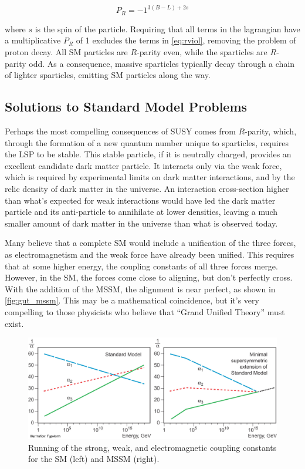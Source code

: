 \begin{equation}
P_R = -1^{3(B-L)+2s}
\end{equation}

where $s$ is the spin of the particle. Requiring that all terms in the lagrangian have a multiplicative $P_R$ of 1 excludes the terms in \autoref{eq:rviol}, removing the problem of proton decay. All \ac{SM} particles are $R$-parity even, while the sparticles are $R$-parity odd. As a consequence, massive sparticles typically decay through a chain of lighter sparticles, emitting \ac{SM} particles along the way.  

\subsection{Solutions to Standard Model Problems}

Perhaps the most compelling consequences of \ac{SUSY} comes from $R$-parity, which, through the formation of a new quantum number unique to sparticles, requires the \acf{LSP} to be stable. This stable particle, if it is neutrally charged, provides an excellent candidate dark matter particle. It interacts only via the weak force, which is required by experimental limits on dark matter interactions, and by the relic density of dark matter in the universe. An interaction cross-section higher than what's expected for weak interactions would have led the dark matter particle and its anti-particle to annihilate at lower densities, leaving a much smaller amount of dark matter in the universe than what is observed today.

Many believe that a complete \ac{SM} would include a unification of the three forces, as electromagnetism and the weak force have already been unified. This requires that at some higher energy, the coupling constants of all three forces merge. However, in the \ac{SM}, the forces come close to aligning, but don't perfectly cross. With the addition of the \ac{MSSM}, the alignment is near perfect, as shown in \autoref{fig:gut_mssm}. This may be a mathematical coincidence, but it's very compelling to those physicists who believe that ``Grand Unified Theory'' must exist. 

\begin{centering}
\begin{figure}[!hbt]
\myfloatalign
\includegraphics[width=.9\linewidth]{figures/theory/phypub4highen.jpg}
\caption{Running of the strong, weak, and electromagnetic coupling constants for the \ac{SM} (left) and \ac{MSSM} (right). \cite{nobel2004}}
\label{fig:gut_mssm}
\end{figure}
\end{centering}

